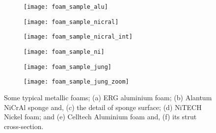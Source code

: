 \begin{figure}
	\centering
	\begin{subfigure}{0.32\textwidth}
		\texttt{[image: foam\_sample\_alu]}
		\caption{}
	\end{subfigure}
	\begin{subfigure}{0.32\textwidth}
		\texttt{[image: foam\_sample\_nicral]}
		\caption{}
	\end{subfigure}
	\begin{subfigure}{0.32\textwidth}
		\texttt{[image: foam\_sample\_nicral\_int]}
		\caption{}
	\end{subfigure}
	\begin{subfigure}{0.38\textwidth}
		\texttt{[image: foam\_sample\_ni]}
		\caption{}
	\end{subfigure}
	\begin{subfigure}{0.3175\textwidth}
		\texttt{[image: foam\_sample\_jung]}
		\caption{}
	\end{subfigure}
	\begin{subfigure}{0.2825\textwidth}
		\texttt{[image: foam\_sample\_jung\_zoom]}
		\caption{}
	\end{subfigure}
	\caption{Some typical metallic foams; (a) ERG aluminium foam\cite{andrewsCompressiveTensileBehaviour1999}; (b) Alantum NiCrAl sponge and, (c) the detail of sponge surface\cite{garcia-morenoCommercialApplicationsMetal2016}; (d) NiTECH Nickel foam\cite{badicheMechanicalPropertiesNonhomogeneous2000}; and (e) Celltech Aluminium foam and, (f) its strut cross-section\cite{jungMicrostructuralCharacterisationExperimental2017}.}\label{fig-int-foams}
\end{figure}

